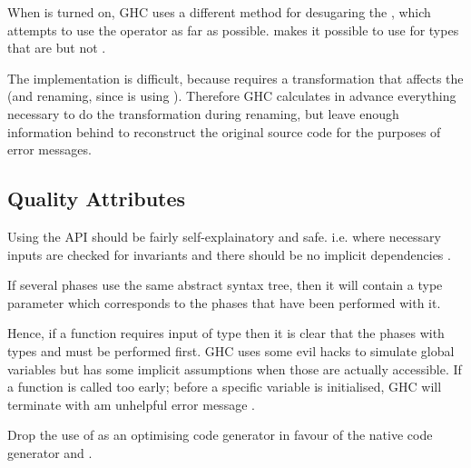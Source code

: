 \begin{explication}
When  is turned on, GHC uses a different method for desugaring the , which attempts to use the  operator \code{<*>} as far as possible.  makes it possible to use  for types that are  but not . 
\end{explication}

The implementation is difficult, because requires a transformation that affects the  (and renaming, since is using ). Therefore GHC calculates in advance everything necessary to do the transformation during renaming, but leave enough information behind to reconstruct the original source code for the purposes of error messages.


\subsection{Quality Attributes}
\label{sec::sec::second::qa}

\begin{qa}
Using the API should be fairly self-explainatory and safe.  i.e. where necessary inputs are checked for invariants and there should be no implicit dependencies \cite{wiki}.  
\end{qa}

\begin{design}
If several phases use the same abstract syntax tree, then it will contain a type parameter which corresponds to the phases that have been performed with it.  
\end{design}

Hence, if a function requires input of type  then it is clear that the phases with types  and   must be performed first. GHC uses some evil hacks to simulate global variables but has some implicit assumptions when those are actually accessible. If a function is called too early; before a specific variable is initialised, GHC will terminate with am unhelpful error message  \cite{wiki}.  

\begin{qa}
Drop the use of  as an optimising code generator in favour of the native code generator and .
\end{qa}


